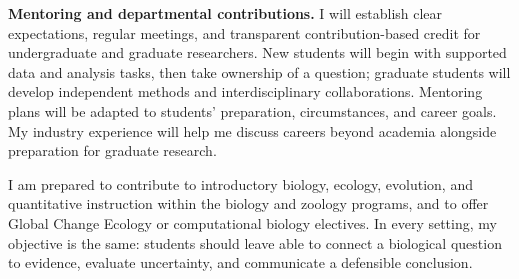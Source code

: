 \documentclass[11pt,letterpaper]{article}
\begin{document}
\textbf{Mentoring and departmental contributions.}
I will establish clear expectations, regular meetings, and transparent contribution-based credit for undergraduate and graduate researchers. New students will begin with supported data and analysis tasks, then take ownership of a question; graduate students will develop independent methods and interdisciplinary collaborations. Mentoring plans will be adapted to students' preparation, circumstances, and career goals. My industry experience will help me discuss careers beyond academia alongside preparation for graduate research.

I am prepared to contribute to introductory biology, ecology, evolution, and quantitative instruction within the biology and zoology programs, and to offer Global Change Ecology or computational biology electives. In every setting, my objective is the same: students should leave able to connect a biological question to evidence, evaluate uncertainty, and communicate a defensible conclusion.
\end{document}
